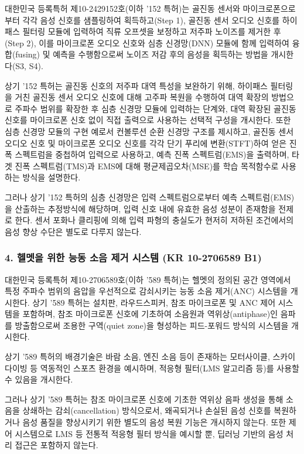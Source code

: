 \documentclass{article}
\begin{document}
대한민국 등록특허 제10-2429152호(이하 '152 특허)는 골진동 센서와 마이크로폰으로부터 각각 음성 신호를 샘플링하여 획득하고(Step 1), 골진동 센서 오디오 신호를 하이패스 필터링 모듈에 입력하여 직류 오프셋을 보정하고 저주파 노이즈를 제거한 후(Step 2), 이를 마이크로폰 오디오 신호와 심층 신경망(DNN) 모듈에 함께 입력하여 융합(fusing) 및 예측을 수행함으로써 노이즈 저감 후의 음성을 획득하는 방법을 개시한다(S3, S4).

상기 '152 특허는 골진동 신호의 저주파 대역 특성을 보완하기 위해, 하이패스 필터링을 거친 골진동 센서 오디오 신호에 대해 고주파 복원을 수행하여 대역 확장의 방법으로 주파수 범위를 확장한 후 심층 신경망 모듈에 입력하는 단계와, 대역 확장된 골진동 신호를 마이크로폰 신호 없이 직접 출력으로 사용하는 선택적 구성을 개시한다.
또한 심층 신경망 모듈의 구현 예로서 컨볼루션 순환 신경망 구조를 제시하고, 골진동 센서 오디오 신호 및 마이크로폰 오디오 신호를 각각 단기 푸리에 변환(STFT)하여 얻은 진폭 스펙트럼을 중첩하여 입력으로 사용하고, 예측 진폭 스펙트럼(EMS)을 출력하며, 타겟 진폭 스펙트럼(TMS)과 EMS에 대해 평균제곱오차(MSE)를 학습 목적함수로 사용하는 방식을 설명한다.

그러나 상기 '152 특허의 심층 신경망은 입력 스펙트럼으로부터 예측 스펙트럼(EMS)을 산출하는 추정방식에 해당하며, 입력 신호 내에 유효한 음성 성분이 존재함을 전제로 한다. 
센서 포화나 클리핑에 의해 입력 파형의 충실도가 현저히 저하된 조건에서의 음성 향상 수단은 별도로 다루지 않는다.


\subsubsection*{4. 헬멧을 위한 능동 소음 제거 시스템 (KR 10-2706589 B1)}

대한민국 등록특허 제10-2706589호(이하 '589 특허)는 헬멧의 정의된 공간 영역에서 특정 주파수 범위의 음압을 우선적으로 감쇠시키는 능동 소음 제거(ANC) 시스템을 개시한다. 
상기 '589 특허는 설치판, 라우드스피커, 참조 마이크로폰 및 ANC 제어 시스템을 포함하며, 참조 마이크로폰 신호에 기초하여 소음원과 역위상(antiphase)인 음파를 방출함으로써 조용한 구역(quiet zone)을 형성하는 피드-포워드 방식의 시스템을 개시한다.

상기 '589 특허의 배경기술은 바람 소음, 엔진 소음 등이 존재하는 모터사이클, 스카이다이빙 등 역동적인 스포츠 환경을 예시하며, 적응형 필터(LMS 알고리즘 등)를 사용할 수 있음을 개시한다.

그러나 상기 '589 특허는 참조 마이크로폰 신호에 기초한 역위상 음파 생성을 통해 소음을 상쇄하는 감쇠(cancellation) 방식으로서, 왜곡되거나 손실된 음성 신호를 복원하거나 음성 품질을 향상시키기 위한 별도의 음성 복원 기능은 개시하지 않는다. 
또한 제어 시스템으로 LMS 등 전통적 적응형 필터 방식을 예시할 뿐, 딥러닝 기반의 음성 처리 접근은 포함하지 않는다.
\end{document}
